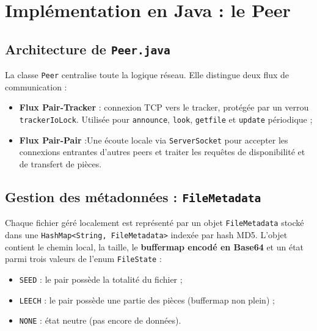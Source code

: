 \documentclass[12pt,a4paper]{article}
\begin{document}
\section{Implémentation en Java : le Peer}

\subsection{Architecture de \texttt{Peer.java}}

La classe \texttt{Peer} centralise toute la logique réseau. Elle distingue
deux flux de communication :

\begin{itemize}[leftmargin=1.2cm]
  \item \textbf{Flux Pair-Tracker} : connexion TCP vers le tracker,
        protégée par un verrou \texttt{trackerIoLock}.
        Utilisée pour \texttt{announce}, \texttt{look}, \texttt{getfile} et
        \texttt{update} périodique ;
  \item \textbf{Flux Pair-Pair} :Une écoute locale via \texttt{ServerSocket} pour accepter les connexions entrantes d'autres peers et traiter les requêtes de disponibilité et de transfert de pièces.
\end{itemize}

\subsection{Gestion des métadonnées : \texttt{FileMetadata}}

Chaque fichier géré localement est représenté par un objet
\texttt{FileMetadata} stocké dans une \texttt{HashMap<String, FileMetadata>}
indexée par hash MD5. L'objet contient le chemin local, la taille, le
\textbf{buffermap encodé en Base64} et un état parmi trois valeurs de
l'enum \texttt{FileState} :

\begin{itemize}[leftmargin=1.2cm]
  \item \texttt{SEED} : le pair possède la totalité du fichier ;
  \item \texttt{LEECH} : le pair possède une partie des pièces (buffermap non
        plein) ;
  \item \texttt{NONE} : état neutre (pas encore de données).
\end{itemize}
\end{document}
